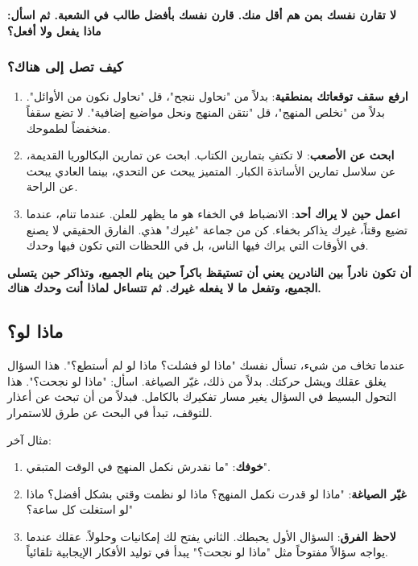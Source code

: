 \documentclass[12pt,a4paper]{book}
\newcommand{\importantAr}[1]{%
	\begin{important}
		\bfseries #1
	\end{important}
}
\begin{document}
	\importantAr{لا تقارن نفسك بمن هم أقل منك. قارن نفسك بأفضل طالب في الشعبة. ثم اسأل: ماذا يفعل ولا أفعل؟}
	
	\subsubsection*{كيف تصل إلى هناك؟}
	
	\begin{enumerate}
		\item \textbf{ارفع سقف توقعاتك بمنطقية}: بدلاً من "نحاول ننجح"، قل "نحاول نكون من الأوائل". بدلاً من "نخلص المنهج"، قل "نتقن المنهج ونحل مواضيع إضافية". لا تضع سقفاً منخفضاً لطموحك.
		\item \textbf{ابحث عن الأصعب}: لا تكتفِ بتمارين الكتاب. ابحث عن تمارين البكالوريا القديمة، عن سلاسل تمارين الأساتذة الكبار. المتميز يبحث عن التحدي، بينما العادي يبحث عن الراحة.
		\item \textbf{اعمل حين لا يراك أحد}: الانضباط في الخفاء هو ما يظهر للعلن. عندما تنام، عندما تضيع وقتاً، غيرك يذاكر بخفاء. كن من جماعة "غيرك" هذي. الفارق الحقيقي لا يصنع في الأوقات التي يراك فيها الناس، بل في اللحظات التي تكون فيها وحدك.
	\end{enumerate}
	
	\importantAr{أن تكون نادراً بين النادرين يعني أن تستيقظ باكراً حين ينام الجميع، وتذاكر حين يتسلى الجميع، وتفعل ما لا يفعله غيرك. ثم تتساءل لماذا أنت وحدك هناك.}
	
	\subsection{ماذا لو؟}
	\label{subsec:what-if}
	
	عندما تخاف من شيء، تسأل نفسك "ماذا لو فشلت؟ ماذا لو لم أستطع؟". هذا السؤال يغلق عقلك ويشل حركتك. بدلاً من ذلك، غيّر الصياغة. اسأل: "ماذا لو نجحت؟". هذا التحول البسيط في السؤال يغير مسار تفكيرك بالكامل. فبدلاً من أن تبحث عن أعذار للتوقف، تبدأ في البحث عن طرق للاستمرار.
	
	مثال آخر:
	
	\begin{enumerate}
		\item \textbf{خوفك}: "ما نقدرش نكمل المنهج في الوقت المتبقي".
		\item \textbf{غيّر الصياغة}: "ماذا لو قدرت نكمل المنهج؟ ماذا لو نظمت وقتي بشكل أفضل؟ ماذا لو استغلت كل ساعة؟"
		\item \textbf{لاحظ الفرق}: السؤال الأول يحبطك. الثاني يفتح لك إمكانيات وحلولاً. عقلك عندما يواجه سؤالاً مفتوحاً مثل "ماذا لو نجحت؟" يبدأ في توليد الأفكار الإيجابية تلقائياً.
	\end{enumerate}
	
\end{document}
